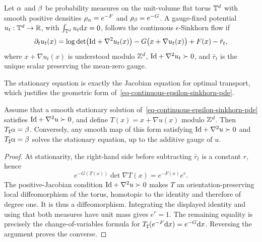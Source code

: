 \begin{defn}\label{def-continuous-epsilon-sinkhorn}
	Let $\alpha$ and $\beta$ be probability measures on the unit-volume flat torus $\mathbb{T}^d$ with smooth positive densities $\rho_{\alpha}=e^{-F}$ and $\rho_{\beta}=e^{-G}$. A gauge-fixed potential $u_t:\mathbb{T}^d\to\mathbb{R}$, with $\int_{\mathbb{T}^d}u_t\mathrm{d} x=0$, follows the continuous $\epsilon$-Sinkhorn flow if
	\begin{equation}\label{eq-continuous-epsilon-sinkhorn-pde}
		\partial_t u_t(x)
		=
		\log\det\bigl(\mathrm{Id}+\nabla^2u_t(x)\bigr)
		-G\bigl(x+\nabla u_t(x)\bigr)
		+F(x)-\bar r_t,
	\end{equation}
	where $x+\nabla u_t(x)$ is understood modulo $\mathbb{Z}^d$, $\mathrm{Id}+\nabla^2u_t\succ0$, and $\bar r_t$ is the unique scalar preserving the mean-zero gauge.
\end{defn}

The stationary equation is exactly the Jacobian equation for optimal transport, which justifies the geometric form of~\eqref{eq-continuous-epsilon-sinkhorn-pde}.

\begin{prop}\label{prop-continuous-sinkhorn-stationary}
	Assume that a smooth stationary solution of~\eqref{eq-continuous-epsilon-sinkhorn-pde} satisfies $\mathrm{Id}+\nabla^2u\succ0$, and define $T(x)=x+\nabla u(x)$ modulo $\mathbb{Z}^d$. Then $T_\sharp\alpha=\beta$. Conversely, any smooth map of this form satisfying $\mathrm{Id}+\nabla^2u\succ0$ and $T_\sharp\alpha=\beta$ solves the stationary equation, up to the additive gauge of $u$.
\end{prop}

\begin{proof}
	At stationarity, the right-hand side before subtracting $\bar r_t$ is a constant $r$, hence
	\[
		e^{-G(T(x))}\det\nabla T(x)=e^{-F(x)}e^r.
	\]
	The positive-Jacobian condition $\mathrm{Id}+\nabla^2u\succ0$ makes $T$ an orientation-preserving local diffeomorphism of the torus, homotopic to the identity and therefore of degree one. It is thus a diffeomorphism. Integrating the displayed identity and using that both measures have unit mass gives $e^r=1$. The remaining equality is precisely the change-of-variables formula for $T_\sharp(e^{-F}\mathrm{d} x)=e^{-G}\mathrm{d} x$. Reversing the argument proves the converse.
\end{proof}

